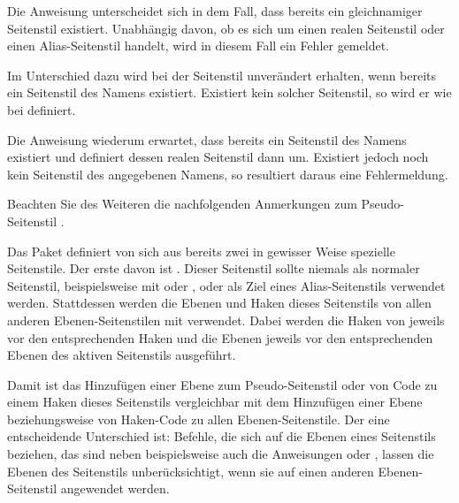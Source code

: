 Die Anweisung  unterscheidet sich in dem
Fall, dass bereits ein gleichnamiger Seitenstil existiert. Unabhängig davon,
ob es sich um einen realen Seitenstil oder einen Alias-Seitenstil handelt,
wird in diesem Fall ein Fehler gemeldet.%
\fi

Im Unterschied dazu wird bei  der Seitenstil
unverändert erhalten, wenn bereits ein Seitenstil des Namens
 existiert. Existiert kein solcher Seitenstil, so wird
er wie bei  definiert.

Die Anweisung  wiederum erwartet, dass
bereits ein Seitenstil des Namens  existiert und
definiert dessen realen Seitenstil dann um. Existiert jedoch noch kein
Seitenstil des angegebenen Namens, so resultiert daraus eine Fehlermeldung.

Beachten Sie des Weiteren die nachfolgenden Anmerkungen zum Pseudo-Seitenstil
.%
\EndIndexGroup


\begin{Declaration}
\end{Declaration}
%
%
Das Paket  definiert von sich aus bereits zwei in gewisser
Weise spezielle Seitenstile. Der erste davon ist
. Dieser
Seitenstil sollte niemals als normaler Seitenstil, beispielsweise mit
 oder , oder
als Ziel eines Alias-Seitenstils verwendet werden. Stattdessen werden die
Ebenen und Haken dieses Seitenstils von allen anderen
Ebenen-Seitenstilen mit verwendet. Dabei werden die Haken von
 jeweils vor den entsprechenden Haken und die Ebenen
jeweils vor den entsprechenden Ebenen des aktiven Seitenstils ausgeführt.

Damit ist das Hinzufügen einer Ebene zum Pseudo-Seitenstil
 oder von Code zu einem Haken dieses Seitenstils
vergleichbar mit dem Hinzufügen einer Ebene beziehungsweise von Haken-Code zu
allen Ebenen-Seitenstile. Der eine entscheidende Unterschied ist: Befehle, die
sich auf die Ebenen eines Seitenstils beziehen, das sind neben
 beispielsweise auch die
Anweisungen  oder
, lassen die Ebenen des
Seitenstils  unberücksichtigt, wenn sie auf einen
anderen Ebenen-Seitenstil angewendet werden.

